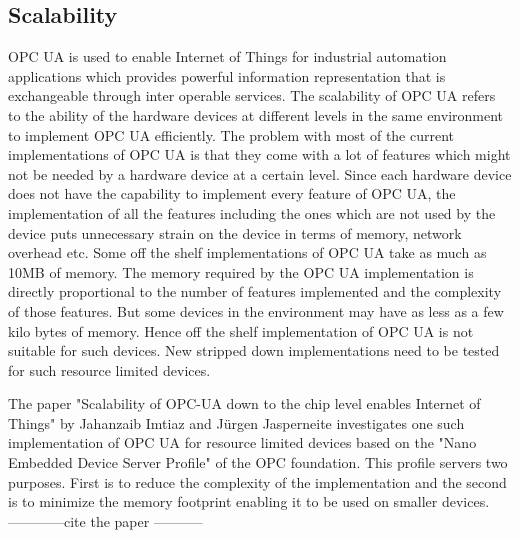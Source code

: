 \documentclass[conference]{IEEEtran}
\begin{document}
\subsection{Scalability}
OPC UA is used to enable Internet of Things for industrial automation applications which provides powerful information representation that is exchangeable through inter operable services. The scalability of OPC UA refers to the ability of the hardware devices at different levels in the same environment to implement OPC UA efficiently. The problem with most of the current implementations of OPC UA is that they come with a lot of features which might not be needed by a hardware device at a certain level. Since each hardware device does not have the capability to implement every feature of OPC UA, the implementation  of all the features including the ones which are not used by the device puts unnecessary strain on the device in terms of memory, network overhead etc. 
Some off the shelf implementations of OPC UA take as much as 10MB of memory. \cite{6622935} The memory required by the OPC UA implementation is directly proportional to the number of features implemented and the complexity of those features. But some devices in the environment may have as less as a few kilo bytes of memory. Hence off the shelf implementation of OPC UA is not suitable for such devices. New stripped down implementations need to be tested for such resource limited devices. 

The paper "Scalability of OPC-UA down to the chip level enables Internet of Things" by Jahanzaib Imtiaz and Jürgen Jasperneite investigates one such implementation of OPC UA for resource limited devices based on the "Nano Embedded Device Server Profile" of the OPC foundation. This profile servers two purposes. First is to reduce the complexity of the implementation and the second is to minimize the memory footprint enabling it to be used on smaller devices.------------cite the paper -----------
\end{document}
